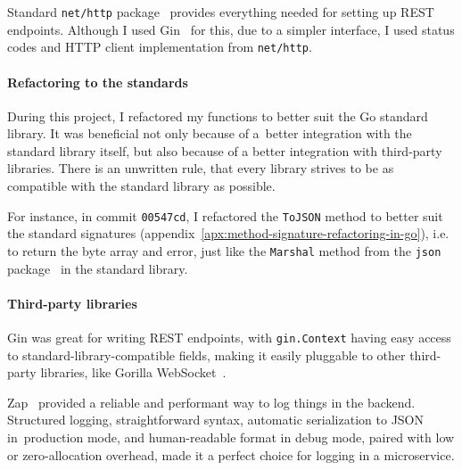 Standard \texttt{net/http} package~\cite{cox_http_2022} provides everything
needed for setting up \ac{REST} endpoints.
Although I used Gin~\cite{martinez-almeida_gin_2022} for this,
due to a simpler interface,
I used status codes
and \ac{HTTP} client implementation
from \texttt{net/http}.

\paragraph*{Refactoring to the standards}\label{sec:refactoring-to-the-standards}

During this project,
I refactored my functions to better suit
the Go standard library.
It was beneficial
not only because of a~better integration
with the standard library itself,
but also because of a better integration
with third-party libraries.
There is an unwritten rule,
that every library strives
to be as compatible
with the standard library as possible.

For instance,
in commit \texttt{00547cd},
I refactored the \texttt{ToJSON} method
to better suit the standard signatures
(appendix~\ref{apx:method-signature-refactoring-in-go}),
i.e. to return the byte array and error,
just like the \texttt{Marshal} method
from the \texttt{json} package~\cite{cox_json_2022}
in the standard library.

\paragraph*{Third-party libraries}\label{sec:third-party-libraries}

Gin was great for writing \ac{REST} endpoints,
with \texttt{gin.Con\-text} having easy access to
standard-library-compatible fields,
making it easily pluggable to other third-party libraries,
like Gorilla WebSocket~\cite{burd_gorilla_2022}.

Zap~\cite{shah_zap_2022} provided a reliable
and performant way to log things in the backend.
Structured logging,
straightforward syntax,
automatic serialization to \ac{JSON} in~production mode,
and human-readable format in debug mode,
paired with low or zero-allocation overhead,
made it a perfect choice for logging in a microservice.

